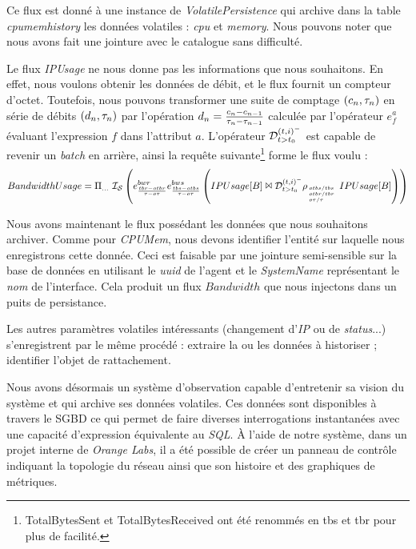 Ce flux est donné à une instance de \textit{VolatilePersistence} qui archive dans la table \textit{cpumemhistory} les données volatiles : \textit{cpu} et \textit{memory}. Nous pouvons noter que nous avons fait une jointure avec le catalogue sans difficulté.

Le flux \textit{IPUsage} ne nous donne pas les informations que nous souhaitons. En effet, nous voulons obtenir les données de débit, et le flux fournit un compteur d'octet. Toutefois, nous pouvons transformer une suite de comptage $(c_n,\tau_n)$ en série de débits $(d_n,\tau_n)$ par l'opération $d_n=\frac{c_n-c_{n-1}}{\tau_n-\tau_{n-1}}$ calculée par l'opérateur $e_f^a$ évaluant l'expression $f$ dans l'attribut $a$. L'opérateur $\mathcal{D}_{t>t_0}^{(t,i)^-}$ est capable de revenir un \textit{batch} en arrière, ainsi la requête suivante\footnote{TotalBytesSent et TotalBytesReceived ont été renommés en tbs et tbr pour plus de facilité.} forme le flux voulu :
$$BandwidthUsage = \Pi_{...}\ \mathcal{I_S} \left( e_{\frac{tbr-otbr}{\tau-o\tau}}^{bwr} e_{\frac{tbs-otbs}{\tau-o\tau}}^{bws}\left(IPUsage[B] \Join \mathcal{D}_{t>t_0}^{(t,i)^-} \rho_{\hspace{-0.33em}\mbox{\tiny $\begin{array}{l} otbs/tbs\\otbr/tbr\\ o\tau/\tau\end{array}$}}IPUsage[B]\right)\right)$$

Nous avons maintenant le flux possédant les données que nous souhaitons archiver. Comme pour \textit{CPUMem}, nous devons identifier l'entité sur laquelle nous enregistrons cette donnée. Ceci est faisable par une jointure semi-sensible sur la base de données en utilisant le \textit{uuid} de l'agent et le \textit{SystemName} représentant le \textit{nom} de l'interface. Cela produit un flux $Bandwidth$ que nous injectons dans un puits de persistance.

Les autres paramètres volatiles intéressants (changement d'\textit{IP} ou de \textit{status}...) s'enregistrent par le même procédé : extraire la ou les données à historiser ; identifier l'objet de rattachement.

Nous avons désormais un système d'observation capable d'entretenir sa vision du système et qui archive ses données volatiles. Ces données sont disponibles à travers le SGBD ce qui permet de faire diverses interrogations instantanées avec une capacité d'expression équivalente au \textit{SQL}. À l'aide de notre système, dans un projet interne de \textit{Orange Labs}, il a été possible de créer un panneau de contrôle indiquant la topologie du réseau ainsi que son histoire et des graphiques de métriques.

